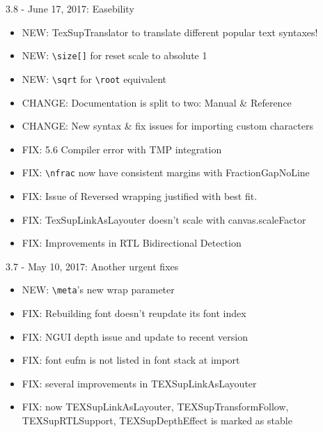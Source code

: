 \documentclass[12pt]{article}
\begin{document}
3.8 - June 17, 2017: Easebility
\begin{itemize}
\item NEW: TexSupTranslator to translate different popular text syntaxes!
\item NEW: \verb|\size[]| for reset scale to absolute 1
\item NEW: \verb|\sqrt| for \verb|\root| equivalent
\item CHANGE: Documentation is split to two: Manual \& Reference
\item CHANGE: New syntax \& fix issues for importing custom characters
\item FIX: 5.6 Compiler error with TMP integration
\item FIX: \verb|\nfrac| now have consistent margins with FractionGapNoLine
\item FIX: Issue of Reversed wrapping justified with best fit.
\item FIX: TexSupLinkAsLayouter doesn't scale with canvas.scaleFactor
\item FIX: Improvements in RTL Bidirectional Detection
\end{itemize}


3.7 - May 10, 2017: Another urgent fixes
\begin{itemize}
\item NEW: \verb|\meta|'s new wrap parameter
\item FIX: Rebuilding font doesn't reupdate its font index
\item FIX: NGUI depth issue and update to recent version
\item FIX: font eufm is not listed in font stack at import
\item FIX: several improvements in TEXSupLinkAsLayouter
\item FIX: now TEXSupLinkAsLayouter, TEXSupTransformFollow, TEXSupRTLSupport, TEXSupDepthEffect is marked as stable
\end{itemize}
\end{document}
